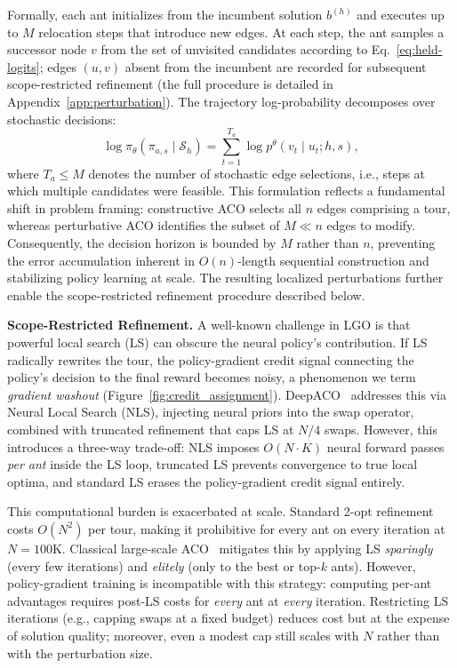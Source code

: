 \documentclass[sigconf]{acmart}
\begin{document}
Formally, each ant initializes from the incumbent solution $b^{(h)}$ and executes up to $M$ relocation steps that introduce new edges.
At each step, the ant samples a successor node $v$ from the set of unvisited candidates according to Eq.~\eqref{eq:held-logits}; edges $(u,v)$ absent from the incumbent are recorded for subsequent scope-restricted refinement (the full procedure is detailed in Appendix~\ref{app:perturbation}).
The trajectory log-probability decomposes over stochastic decisions:
\begin{equation}
\log \pi_\theta(\pi_{a,s} \mid \mathcal{S}_h) = \sum_{t=1}^{T_a} \log p^\theta(v_t \mid u_t; h, s),
\label{eq:logp-trajectory}
\end{equation}
where $T_a \le M$ denotes the number of stochastic edge selections, i.e., steps at which multiple candidates were feasible.
This formulation reflects a fundamental shift in problem framing: constructive ACO selects all $n$ edges comprising a tour, whereas perturbative ACO identifies the subset of $M \ll n$ edges to modify.
Consequently, the decision horizon is bounded by $M$ rather than $n$, preventing the error accumulation inherent in $O(n)$-length sequential construction and stabilizing policy learning at scale.
The resulting localized perturbations further enable the scope-restricted refinement procedure described below.

\smallskip\noindent\textbf{Scope-Restricted Refinement.}
\label{sec:localized-ls}
A well-known challenge in LGO is that powerful local search (LS) can obscure the neural policy's contribution.
If LS radically rewrites the tour, the policy-gradient credit signal connecting the policy's decision to the final reward becomes noisy, a phenomenon we term \emph{gradient washout} (Figure~\ref{fig:credit_assignment}).
DeepACO~\cite{deepaco} addresses this via Neural Local Search (NLS), injecting neural priors into the swap operator, combined with truncated refinement that caps LS at $N/4$ swaps.
However, this introduces a three-way trade-off: NLS imposes $O(N{\cdot}K)$ neural forward passes \emph{per ant} inside the LS loop, truncated LS prevents convergence to true local optima, and standard LS erases the policy-gradient credit signal entirely.

This computational burden is exacerbated at scale.
Standard 2-opt refinement costs $O(N^2)$ per tour, making it prohibitive for every ant on every iteration at $N{=}100$K.
Classical large-scale ACO~\citep{partialACO, P-ACO} mitigates this by applying LS \emph{sparingly} (every few iterations) and \emph{elitely} (only to the best or top-$k$ ants).
However, policy-gradient training is incompatible with this strategy: computing per-ant advantages requires post-LS costs for \emph{every} ant at \emph{every} iteration.
Restricting LS iterations (e.g., capping swaps at a fixed budget) reduces cost but at the expense of solution quality; moreover, even a modest cap still scales with $N$ rather than with the perturbation size.
\end{document}
